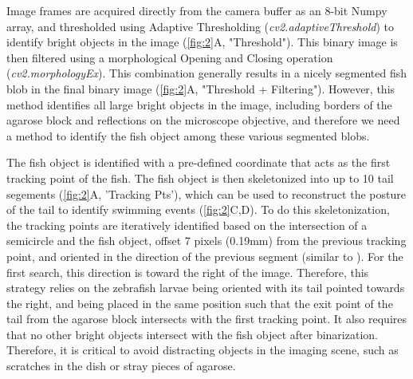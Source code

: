 \documentclass[9pt,lineno]{RandlettLab_elife}
\begin{document}
\begin{figure}
\begin{fullwidth}
\begin{center}
\label{video:S1}


\end{center}
\end{fullwidth}
\end{figure}

Image frames are acquired directly from the camera buffer as an 8-bit Numpy array, and thresholded using Adaptive Thresholding (\emph{cv2.adaptiveThreshold}) to identify bright objects in the image (\autoref{fig:2}A, "Threshold"). This binary image is then filtered using a morphological Opening and Closing operation (\emph{cv2.morphologyEx}). This combination generally results in a nicely segmented fish blob in the final binary image (\autoref{fig:2}A, "Threshold + Filtering"). However, this method identifies all large bright objects in the image, including borders of the agarose block and reflections on the microscope objective, and therefore we need a method to identify the fish object among these various segmented blobs.

The fish object is identified with a pre-defined coordinate that acts as the first tracking point of the fish. The fish object is then skeletonized into up to 10 tail segements (\autoref{fig:2}A, 'Tracking Pts'), which can be used to reconstruct the posture of the tail to identify swimming events (\autoref{fig:2}C,D). To do this skeletonization, the tracking points are iteratively identified based on the intersection of a semicircle and the fish object, offset 7 pixels (0.19mm) from the previous tracking point, and oriented in the direction of the previous segment (similar to \cite{Stih2019-gx, Randlett2019-fj}). For the first search, this direction is toward the right of the image. Therefore, this strategy relies on the zebrafish larvae being oriented with its tail pointed towards the right, and being placed in the same position such that the exit point of the tail from the agarose block intersects with the first tracking point. It also requires that no other bright objects intersect with the fish object after binarization. Therefore, it is critical to avoid distracting objects in the imaging scene, such as scratches in the dish or stray pieces of agarose.  
\end{document}
